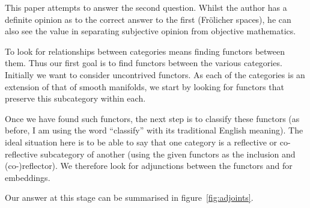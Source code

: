 \documentclass[%
a4paper,%
arxiv,%
defaults
]{myclass}
\begin{document}
This paper attempts to answer the second question.
Whilst the author has a definite opinion as to the correct answer to the first (Fr\"olicher spaces), he can also see the value in separating subjective opinion from objective mathematics.

\medskip

To look for relationships between categories means finding functors between them.
Thus our first goal is to find functors between the various categories.
Initially we want to consider uncontrived functors.
As each of the categories is an extension of that of smooth manifolds, we start by looking for functors that preserve this subcategory within each.

Once we have found such functors, the next step is to classify these functors (as before, I am using the word ``classify'' with its traditional English meaning).
The ideal situation here is to be able to say that one category is a reflective or co\hyp{}reflective subcategory of another (using the given functors as the inclusion and (co\hyp{})reflector).
We therefore look for adjunctions between the functors and for embeddings.

Our answer at this stage can be summarised in figure~\ref{fig:adjoints}.
\end{document}
